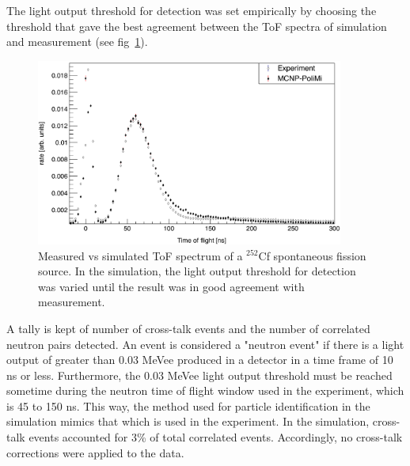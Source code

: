 The light output threshold for detection was set empirically by choosing the threshold that gave the best agreement between the ToF spectra of simulation and measurement (see fig~\ref{fig:Cf252MCNPVsEXP}).
\begin{figure}
    \centering
    \includegraphics[width = 0.9\textwidth]{Content/Errors/Cf252MCNPVsEXP.png}
    \caption{Measured vs simulated ToF spectrum of a $^{252}$Cf spontaneous fission source.
    In the simulation, the light output threshold for detection was varied until the result was in good agreement with measurement.}
    \label{fig:Cf252MCNPVsEXP}
\end{figure}
A tally is kept of number of cross-talk events and the number of correlated neutron pairs detected.
An event is considered a "neutron event" if there is a light output of greater than 0.03 MeVee produced in a detector in a time frame of 10 ns or less.
Furthermore, the 0.03 MeVee light output threshold must be reached sometime during the neutron time of flight window used in the experiment, which is 45 to 150 ns.
This way, the method used for particle identification in the simulation mimics that which is used in the experiment.
In the simulation, cross-talk events accounted for 3\% of total correlated events.
Accordingly, no cross-talk corrections were applied to the data.

